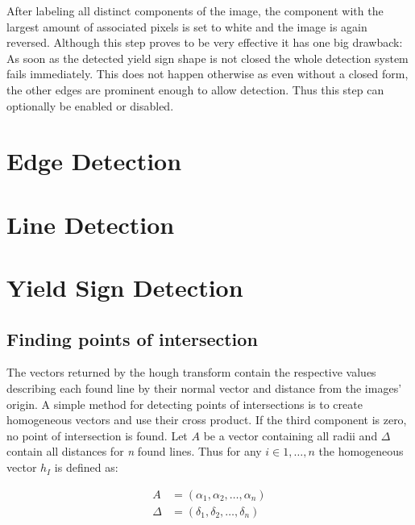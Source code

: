 \documentclass{report}
\begin{document}
After labeling all distinct components of the image, the component
with the largest amount of associated pixels is set to white and the
image is again reversed. Although this step proves to be very
effective it has one big drawback: As soon as the detected yield sign
shape is not closed the whole detection system fails immediately. This
does not happen otherwise as even without a closed form, the other
edges are prominent enough to allow detection. Thus this step can
optionally be enabled or disabled.

{\color{red}{To do: Example pictures}}


\section{Edge Detection}
\label{sec:pipeline_edgedet}
{\color{red}{To be written: Either Dilation + XOR or Sobel for Fast Hough}}


\section{Line Detection}
\label{sec:pipeline_linedet}
{\color{red}{To be written: Either Hough or Fast Hough}}


\section{Yield Sign Detection}
\label{sec:pipeline_yielddet}
{\color{red}{To be written}}


\subsection{Finding points of intersection}

The vectors returned by the hough transform contain the respective
values describing each found line by their normal vector and distance
from the images' origin. A simple method for detecting points of
intersections is to create homogeneous vectors and use their cross
product. If the third component is zero, no point of intersection is
found. Let \( A \) be a vector containing all radii and \( \Delta \)
contain all distances for \textit{n} found lines. Thus for any \( i
\in 1, \dots, n \) the homogeneous vector \( h_I \) is defined as:

\begin{equation}
  \begin{split}
    A & = (\alpha_1, \alpha_2, \dots, \alpha_n) \\
    \Delta & = (\delta_1, \delta_2, \dots, \delta_n)
  \end{split}
\end{equation}
\end{document}
